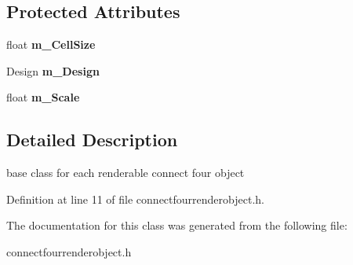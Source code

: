 \subsection*{Protected Attributes}
\begin{DoxyCompactItemize}
\item 
\hypertarget{class_connect_four_render_object_a507319d76cc95bd30ca5a8e4e5e4e5c6}{float {\bfseries m\-\_\-\-Cell\-Size}}\label{class_connect_four_render_object_a507319d76cc95bd30ca5a8e4e5e4e5c6}

\item 
\hypertarget{class_connect_four_render_object_a039a66092b64a1b5940118d7430ba302}{Design {\bfseries m\-\_\-\-Design}}\label{class_connect_four_render_object_a039a66092b64a1b5940118d7430ba302}

\item 
\hypertarget{class_connect_four_render_object_aa864124c16d148218a340af0340d6ddf}{float {\bfseries m\-\_\-\-Scale}}\label{class_connect_four_render_object_aa864124c16d148218a340af0340d6ddf}

\end{DoxyCompactItemize}


\subsection{Detailed Description}
base class for each renderable connect four object 

Definition at line 11 of file connectfourrenderobject.\-h.



The documentation for this class was generated from the following file\-:\begin{DoxyCompactItemize}
\item 
connectfourrenderobject.\-h\end{DoxyCompactItemize}
